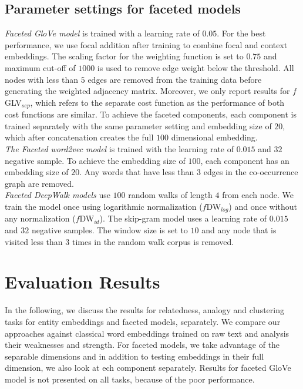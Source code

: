 \subsection{Parameter settings for faceted models}
\emph{Faceted GloVe model} is trained with a learning rate of $0.05$. For the best performance, we use focal addition after training to combine  focal and context embeddings. The scaling factor for the weighting function is set to $0.75$ and maximum cut-off of $1000$ is used to remove edge weight below the threshold. All nodes with less than $5$ edges are removed from the training data before generating the weighted adjacency matrix. Moreover, we only report results for $f$GLV$_{sep}$, which refers to the separate cost function as the performance of both cost functions are similar. To achieve the faceted components, each component is trained separately with the same parameter setting and embedding size of $20$, which after concatenation creates the full $100$ dimensional embedding. \\

\noindent
\emph{The Faceted word2vec model} is trained with the learning rate of $0.015$ and $32$ negative sample. To achieve the embedding size of $100$, each component has an embedding size of $20$. Any words that have less than $3$ edges in the co-occurrence graph are removed. \\

\noindent
\emph{Faceted DeepWalk models} use $100$ random walks of length $4$ from each node. We train the model once using logarithmic normalization ($f$DW$_{log}$) and once without any normalization ($f$DW$_{id}$). The skip-gram model uses a learning rate of $0.015$ and $32$ negative samples. The window size is set to $10$ and any node that is visited less than $3$ times in the random walk corpus is removed. 

\section{Evaluation Results}\label{sec:eval_results}
In the following, we discuss the results for relatedness, analogy and clustering tasks for entity embeddings and faceted models, separately. We compare our approaches against classical word embeddings trained on raw text and analysis their weaknesses and strength. For faceted models, we take advantage of the separable dimensions and in addition to testing embeddings in their full dimension, we also look at ech component separately. Results for faceted GloVe model is not presented on all tasks, because of the poor performance. 
